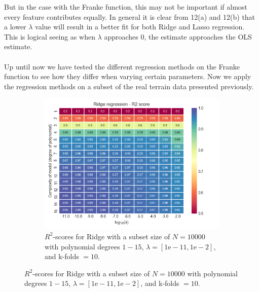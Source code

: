 \documentclass[a4paper,twocolumn]{article}
\begin{document}
But in the case with the Franke function, this may not be important if almost every feature contributes equally. In general it is clear from 12(a) and 12(b) that a lower $\lambda$ value will result in a better fit for both Ridge and Lasso regression. This is logical seeing as when $\lambda$ approaches 0, the estimate approaches the OLS estimate.\\
\\
\noindent Up until now we have tested the different regression methods on the Franke function to see how they differ when varying certain parameters. Now we apply the regression methods on a subset of the real terrain data presented previously.
\begin{figure}[ht]
    \centering
    \begin{subfigure}[b]{0.9\columnwidth}
        \includegraphics[width=\columnwidth]{lambda_vs_complexity_heatmap_Ridge_N=10000_Noise=0.0_Degree=115.png}
        \caption{$R^{2}$-scores for Ridge with a subset size of $N=10000$ with polynomial degrees $1- 15$, $\lambda = [1\textrm{e}-11, 1\textrm{e}-2]$, and k-folds $= 10$.}
    \end{subfigure}
    

\end{figure}
\end{document}
